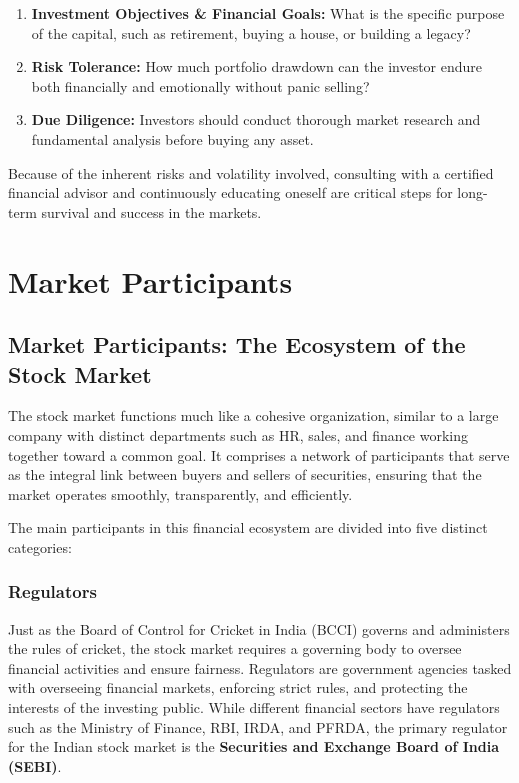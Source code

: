 \documentclass[12pt,openany]{book}
\begin{document}
\begin{enumerate}[leftmargin=*]
    \item \textbf{Investment Objectives \& Financial Goals:} What is the specific purpose of the capital, such as retirement, buying a house, or building a legacy?
    \item \textbf{Risk Tolerance:} How much portfolio drawdown can the investor endure both financially and emotionally without panic selling?
    \item \textbf{Due Diligence:} Investors should conduct thorough market research and fundamental analysis before buying any asset.
\end{enumerate}

Because of the inherent risks and volatility involved, consulting with a certified financial advisor and continuously educating oneself are critical steps for long-term survival and success in the markets.


\section{Market Participants}

\subsection{Market Participants: The Ecosystem of the Stock Market}
The stock market functions much like a cohesive organization, similar to a large company with distinct departments such as HR, sales, and finance working together toward a common goal. It comprises a network of participants that serve as the integral link between buyers and sellers of securities, ensuring that the market operates smoothly, transparently, and efficiently.

The main participants in this financial ecosystem are divided into five distinct categories:

\subsubsection{Regulators}
Just as the Board of Control for Cricket in India (BCCI) governs and administers the rules of cricket, the stock market requires a governing body to oversee financial activities and ensure fairness. Regulators are government agencies tasked with overseeing financial markets, enforcing strict rules, and protecting the interests of the investing public. While different financial sectors have regulators such as the Ministry of Finance, RBI, IRDA, and PFRDA, the primary regulator for the Indian stock market is the \textbf{Securities and Exchange Board of India (SEBI)}.
\end{document}
